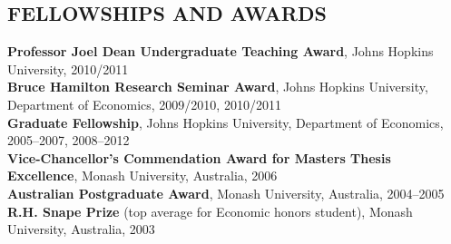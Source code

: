 \documentclass[11pt]{res}
\begin{document}
\begin{resume}
\section{FELLOWSHIPS AND AWARDS}\vspace{2mm}
{\bf Professor Joel Dean Undergraduate Teaching Award}, Johns Hopkins University, 2010/2011\vspace{1.5mm}\\
{\bf Bruce Hamilton Research Seminar Award}, Johns Hopkins University, Department of Economics, 2009/2010, 2010/2011\vspace{1.5mm}\\
{\bf Graduate Fellowship}, Johns Hopkins University, Department of Economics, 2005--2007, 2008--2012\vspace{1.5mm}\\
{\bf Vice-Chancellor's Commendation Award for Masters Thesis Excellence}, Monash University, Australia, 2006\vspace{1.5mm}\\
{\bf Australian Postgraduate Award}, Monash University, Australia, 2004--2005\vspace{1.5mm}\\
{\bf R.H. Snape Prize} (top average for Economic honors student), Monash University, Australia, 2003 \\

\end{resume}
\end{document}
